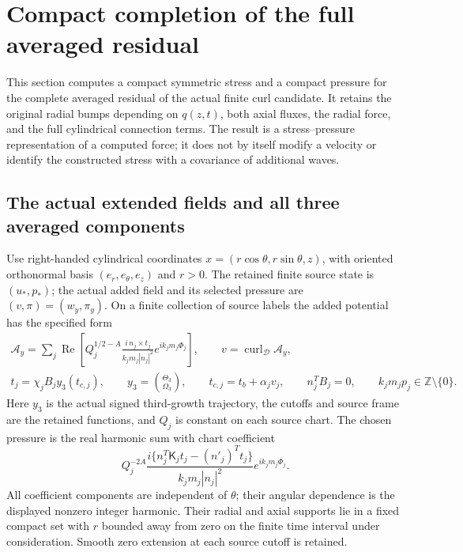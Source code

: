 \section{Compact completion of the full averaged residual}
\label{mcstress:section}

This section computes a compact symmetric stress and a compact pressure
for the complete averaged residual of the actual finite curl candidate.
It retains the original radial bumps depending on $q(z,t)$, both axial
fluxes, the radial force, and the full cylindrical connection terms.
The result is a stress--pressure representation of a computed force;
it does not by itself modify a velocity or identify the constructed
stress with a covariance of additional waves.

\subsection{The actual extended fields and all three averaged components}

Use right-handed cylindrical coordinates
$x=(r\cos\theta,r\sin\theta,z)$, with oriented orthonormal basis
$(e_r,e_\theta,e_z)$ and $r>0$. The retained finite source state is
$(u_*,p_*)$; the actual added field and its selected pressure are
$(v,\pi)=(w_y,\pi_y)$. On a finite collection of source labels the
added potential has the specified form
\begin{equation}\label{mcstress:actual_potential}
\begin{gathered}
 \mathcal A_y=\sum_j\operatorname{Re}
   \left[Q_j^{1/2-A}
     \frac{i\,n_j\times t_j}{k_jm_j|n_j|^2}
                      e^{ik_jm_j\Phi_j}\right],\qquad
 v=\operatorname{curl}_{\mathscr D}\mathcal A_y,\\
 t_j=\chi_jB_jy_3(t_{c,j}),\qquad
 y_3=\binom{\Theta_3}{\Omega_3},\qquad
 t_{c,j}=t_b+\alpha_jv_j,\qquad
 n_j^TB_j=0,\qquad k_jm_jp_j\in\mathbb Z\setminus\{0\}.
\end{gathered}
\end{equation}
Here $y_3$ is the actual signed third-growth trajectory, the cutoffs
and source frame are the retained functions, and $Q_j$ is constant
on each source chart. The chosen pressure is the real harmonic sum
with chart coefficient
\[
 Q_j^{-2A}
 \frac{i\{n_j^T\mathsf K_jt_j-(n'_j)^Tt_j\}}
      {k_jm_j|n_j|^2}e^{ik_jm_j\Phi_j}.
\]
All coefficient components are independent of $\theta$; their angular
dependence is the displayed nonzero integer harmonic. Their radial
and axial supports lie in a fixed compact set with $r$ bounded away
from zero on the finite time interval under consideration. Smooth
zero extension at each source cutoff is retained.


